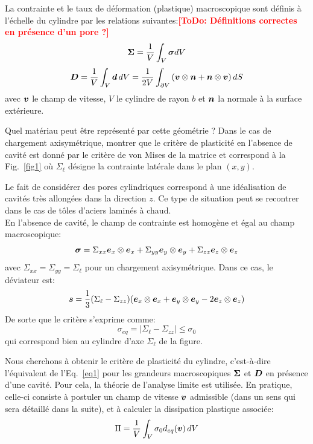 \documentclass[french,english,12pt]{exam}
\newcommand{\todo}[1]{\textbf{\textcolor{red}{[ToDo: #1]}}}
\begin{document}
La contrainte et le taux de déformation (plastique) macroscopique sont définis à l'échelle du cylindre par les relations suivantes:\todo{Définitions correctes en présence d'un pore ?}
\begin{equation}
  \boldsymbol{\Sigma} = \frac{1}{V} \int_V \boldsymbol{\sigma} dV
\end{equation}
\begin{equation}
  \boldsymbol{D} = \frac{1}{V} \int_V \boldsymbol{d} \, dV = \frac{1}{2V} \int_{\partial V} \left(\boldsymbol{v} \otimes \boldsymbol{n} + \boldsymbol{n} \otimes \boldsymbol{v}     \right) dS
\end{equation}
avec $\boldsymbol{v}$ le champ de vitesse, $V$ le cylindre de rayon $b$ et $\boldsymbol{n}$ la normale à la surface extérieure.\\


\begin{questions}
\question Quel matériau peut être représenté par cette géométrie ? Dans le cas de chargement axisymétrique, montrer que le critère de plasticité en l'absence de cavité est donné par le critère de von Mises de la matrice et correspond à la Fig.~\ref{fig1} où $\Sigma_\ell$ désigne la contrainte latérale dans le plan $(x,y)$.\\
\end{questions}
\begin{solution}
Le fait de considérer des pores cylindriques correspond à une idéalisation de cavités très allongées dans la direction $z$. Ce type de situation peut se recontrer dans le cas de tôles d'aciers laminés à chaud.\\

En l'absence de cavité, le champ de contrainte est homogène et égal au champ macroscopique:
$$\boldsymbol{\sigma} = \Sigma_{xx}\boldsymbol{e}_x\otimes\boldsymbol{e}_x + \Sigma_{yy}\boldsymbol{e}_y\otimes\boldsymbol{e}_y +  \Sigma_{zz}\boldsymbol{e}_z\otimes\boldsymbol{e}_z$$
avec $\Sigma_{xx}=\Sigma_{yy}=\Sigma_\ell$ pour un chargement axisymétrique. Dans ce cas, le déviateur est:
$$\boldsymbol{s} = \dfrac{1}{3}(\Sigma_{\ell}-\Sigma_{zz})(\boldsymbol{e}_x\otimes\boldsymbol{e}_x + \boldsymbol{e}_y\otimes\boldsymbol{e}_y - 2\boldsymbol{e}_z\otimes\boldsymbol{e}_z)$$
De sorte que le critère s'exprime comme:
$$\sigma_{eq} = |\Sigma_\ell - \Sigma_{zz}| \leq \sigma_0$$
qui correspond bien au cylindre d'axe $\Sigma_{\ell}$ de la figure.
\end{solution}


Nous cherchons à obtenir le critère de plasticité du cylindre, c'est-à-dire l'équivalent de l'Eq.~\ref{eq1} pour les grandeurs macroscopiques $\boldsymbol{\Sigma}$ et $\boldsymbol{D}$ en présence d'une cavité. Pour cela, la théorie de l'analyse limite est utilisée. En pratique, celle-ci consiste à postuler un champ de vitesse $\boldsymbol{v}$ admissible (dans un sens qui sera détaillé dans la suite), et à calculer la dissipation plastique associée:
\begin{equation}
  \Pi = \frac{1}{V} \int_V \sigma_0 d_{eq}(\boldsymbol{v}) \,dV
  \label{eq3}
\end{equation}
\end{document}
